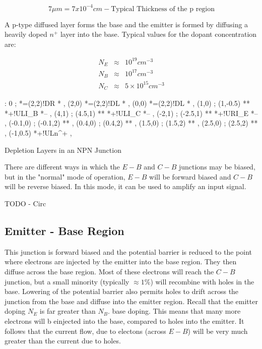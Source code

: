 \documentclass[a4paper,12pt]{article}
\begin{document}
\[ 7 \mu m = 7 x 10^{-4} cm - \mbox{Typical Thickness of the p region} 
\]

A p-type diffused layer forms the base and the emitter is formed
by diffusing a heavily doped $n^{+}$ layer into the base. Typical values
for the dopant concentration are:

\begin{eqnarray*}
N_{E} & \approx & 10^{19} cm^{-3} \\
N_{B} & \approx & 10^{17} cm^{-3} \\
N_{C} & \approx & 5 \times 10^{15} cm^{-3}
\end{eqnarray*}

\begin{table}[hbtp]

\xy <1cm,0cm>:
0 ; *=(2,2)!DR *\frm{-} ,
(2,0) *=(2,2)!DL *\frm{-} ,
(0,0) *=(2,2)!DL *\frm{-} ,
(1,0) ; (1,-0.5) **\dir{-} *+!UL{I_{B}} *-- ,
(4,1) ; (4.5,1) **\dir{-} *+!UL{I_{C}} *-- ,
(-2,1) ; (-2.5,1) **\dir{-} *+!UR{I_{E}} *-- ,
(-0.1,0) ; (-0.1,2) **\dir{--} ,
(0.4,0) ; (0.4,2) **\dir{--} ,
(1.5,0) ; (1.5,2) **\dir{--} ,
(2.5,0) ; (2.5,2) **\dir{--} ,
(-1,0.5) *+!UL{n^{+}} ,
\endxy

\caption{Depletion Layers in an NPN Junction}

\end{table}

There are different ways in which the $E-B$ and $C-B$ junctions
may be biased, but in the "normal" mode of operation, $E-B$ will be
forward biased and $C-B$ will be reverse biased. In this mode, it can be
used to amplify an input signal.

\begin{table}[hbtp]

TODO - Circ

\end{table}

\subsection{Emitter - Base Region}

This junction is forward biased and the potential barrier is reduced to
the point where electrons are injected by the emitter into the base
region. They then diffuse across the base region. Most of these
electrons will reach the $C-B$ junction, but a small minority (typically
$\approx 1\%$) will recombine with holes in the base. Lowering of the
potential barrier also permits holes to drift across the junction from
the base and diffuse into the emitter region. Recall that the emitter
doping $N_{E}$ is far greater than $N_{B}$. base doping. This means that
many more electrons will b einjected into the base, compared to holes
into the emitter. It follows that the current flow, due to electons
(across $E-B$) will be very much greater than the current due to holes.
\end{document}
